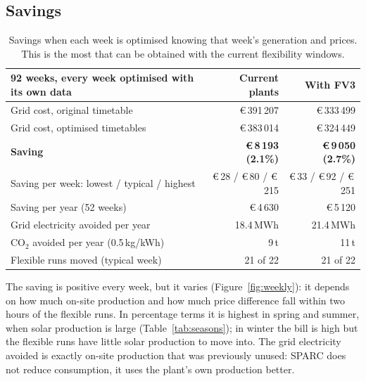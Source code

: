 \documentclass[10pt,a4paper]{scrartcl}
\newcommand{\Eur}[1]{\euro\,#1}
\begin{document}
  \subsection{Savings}
  \label{sec:savings}

  \begin{table}[H]
  \small
  \centering
  \renewcommand{\arraystretch}{1.15}
  \begin{tabularx}{\textwidth}{@{}L{0.5\textwidth} R R@{}}
  \toprule
  \textbf{92 weeks, every week optimised with its own data} & \textbf{Current plants} & \textbf{With FV3} \\
  \midrule
  Grid cost, original timetable          & \Eur{391\,207} & \Eur{333\,499} \\
  Grid cost, optimised timetables        & \Eur{383\,014} & \Eur{324\,449} \\
  \textbf{Saving}                         & \textbf{\Eur{8\,193} (2.1\%)} & \textbf{\Eur{9\,050} (2.7\%)} \\
  Saving per week: lowest / typical / highest & \Eur{28} / \Eur{80} / \Eur{215} & \Eur{33} / \Eur{92} / \Eur{251} \\
  Saving per year (52 weeks)              & \Eur{4\,630} & \Eur{5\,120} \\
  Grid electricity avoided per year       & 18.4\,MWh & 21.4\,MWh \\
  CO$_2$ avoided per year (0.5\,kg/kWh)   & 9\,t & 11\,t \\
  Flexible runs moved (typical week)     & 21 of 22 & 21 of 22 \\
  \bottomrule
  \end{tabularx}
  \caption{Savings when each week is optimised knowing that week's generation and prices. This is
  the most that can be obtained with the current flexibility windows.}
  \label{tab:savings}
  \end{table}

  The saving is positive every week, but it varies (Figure~\ref{fig:weekly}): it depends on how
  much on-site production and how much price difference fall within two hours of the flexible
  runs. In percentage terms it is highest in spring and summer, when solar production is large
  (Table~\ref{tab:seasons}); in winter the bill is high but the flexible runs have little
  solar production to move into. The grid electricity avoided is exactly on-site production that
  was previously unused: SPARC does not reduce consumption, it uses the plant's own production
  better.
\end{document}

